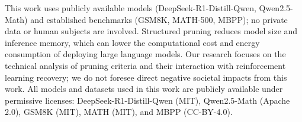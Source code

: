 This work uses publicly available models (DeepSeek-R1-Distill-Qwen, Qwen2.5-Math) and established benchmarks (GSM8K, MATH-500, MBPP); no private data or human subjects are involved.
Structured pruning reduces model size and inference memory, which can lower the computational cost and energy consumption of deploying large language models.
Our research focuses on the technical analysis of pruning criteria and their interaction with reinforcement learning recovery; we do not foresee direct negative societal impacts from this work.
All models and datasets used in this work are publicly available under permissive licenses: DeepSeek-R1-Distill-Qwen (MIT), Qwen2.5-Math (Apache 2.0), GSM8K (MIT), MATH (MIT), and MBPP (CC-BY-4.0).
